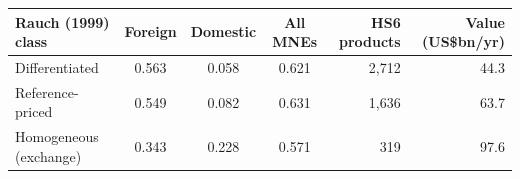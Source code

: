\begin{tabular}{lcccrr}
\toprule
Rauch (1999) class & Foreign & Domestic & All MNEs & HS6 products & Value (US\$bn/yr) \\
\midrule
Differentiated & 0.563 & 0.058 & 0.621 & 2,712 & 44.3 \\
Reference-priced & 0.549 & 0.082 & 0.631 & 1,636 & 63.7 \\
Homogeneous (exchange) & 0.343 & 0.228 & 0.571 & 319 & 97.6 \\
\bottomrule
\end{tabular}
